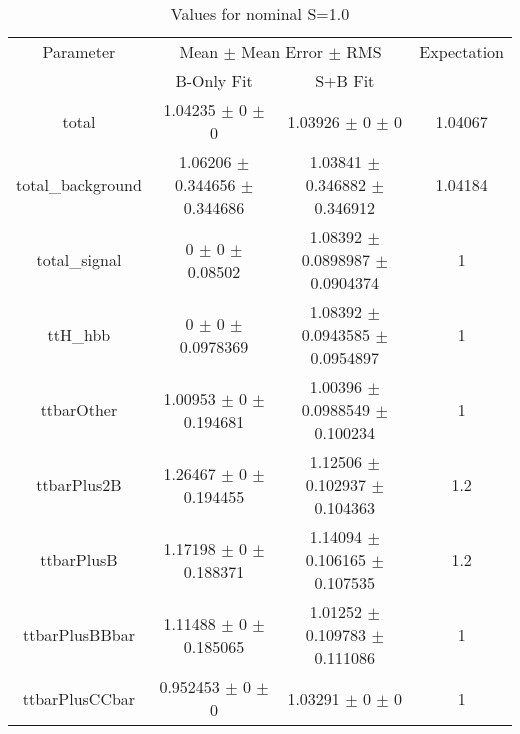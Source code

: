 \begin{table}
\centering
\caption{Values for nominal S=1.0}
\begin{tabular}{cccc}
\toprule
Parameter & \multicolumn{2}{c}{Mean $\pm$ Mean Error $\pm$ RMS} & Expectation\\
 & B-Only Fit & S+B Fit & \\
\midrule
total & \num{1.04235} $\pm$ \num{0} $\pm$ \num{0} & \num{1.03926} $\pm$ \num{0} $\pm$ \num{0} & \num{1.04067}\\
total\_background & \num{1.06206} $\pm$ \num{0.344656} $\pm$ \num{0.344686} & \num{1.03841} $\pm$ \num{0.346882} $\pm$ \num{0.346912} & \num{1.04184}\\
total\_signal & \num{0} $\pm$ \num{0} $\pm$ \num{0.08502} & \num{1.08392} $\pm$ \num{0.0898987} $\pm$ \num{0.0904374} & \num{1}\\
ttH\_hbb & \num{0} $\pm$ \num{0} $\pm$ \num{0.0978369} & \num{1.08392} $\pm$ \num{0.0943585} $\pm$ \num{0.0954897} & \num{1}\\
ttbarOther & \num{1.00953} $\pm$ \num{0} $\pm$ \num{0.194681} & \num{1.00396} $\pm$ \num{0.0988549} $\pm$ \num{0.100234} & \num{1}\\
ttbarPlus2B & \num{1.26467} $\pm$ \num{0} $\pm$ \num{0.194455} & \num{1.12506} $\pm$ \num{0.102937} $\pm$ \num{0.104363} & \num{1.2}\\
ttbarPlusB & \num{1.17198} $\pm$ \num{0} $\pm$ \num{0.188371} & \num{1.14094} $\pm$ \num{0.106165} $\pm$ \num{0.107535} & \num{1.2}\\
ttbarPlusBBbar & \num{1.11488} $\pm$ \num{0} $\pm$ \num{0.185065} & \num{1.01252} $\pm$ \num{0.109783} $\pm$ \num{0.111086} & \num{1}\\
ttbarPlusCCbar & \num{0.952453} $\pm$ \num{0} $\pm$ \num{0} & \num{1.03291} $\pm$ \num{0} $\pm$ \num{0} & \num{1}\\
\bottomrule
\end{tabular}
\end{table}